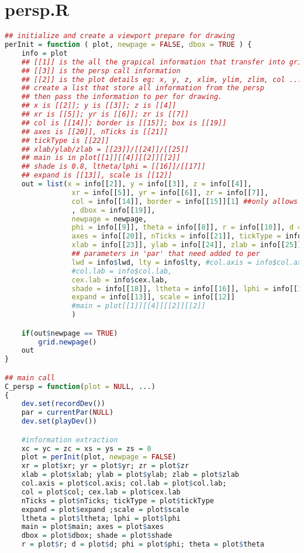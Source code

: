 \section{persp.R}
\begin{lstlisting}[language = R]
## initialize and create a viewport prepare for drawing
perInit = function ( plot, newpage = FALSE, dbox = TRUE ) {
    info = plot
    ## [[1]] is the all the grapical information that transfer into grid
    ## [[3]] is the persp call information
    ## [[2]] is the plot details eg: x, y, z, xlim, ylim, zlim, col ...
    ## create a list that store all information from the persp
    ## then pass the information to per for drawing.
    ## x is [[2]]; y is [[3]]; z is [[4]]
    ## xr is [[5]]; yr is [[6]]; zr is [[7]]
    ## col is [[14]]; border is [[15]]; box is [[19]]
    ## axes is [[20]], nTicks is [[21]]
    ## tickType is [[22]]
    ## xlab/ylab/zlab = [[23]]/[[24]]/[[25]]
    ## main is in plot[[1]][[4]][[2]][[2]]
    ## shade is 0.8, ltheta/lphi = [[16]]/[[17]]
    ## expand is [[13]], scale is [[12]]
    out = list(x = info[[2]], y = info[[3]], z = info[[4]],
                xr = info[[5]], yr = info[[6]], zr = info[[7]],
                col = info[[14]], border = info[[15]][1] ##only allows one color for border
                , dbox = info[[19]],
                newpage = newpage, 
                phi = info[[9]], theta = info[[8]], r = info[[10]], d = info[[11]],
                axes = info[[20]], nTicks = info[[21]], tickType = info[[22]],
                xlab = info[[23]], ylab = info[[24]], zlab = info[[25]],
                ## parameters in 'par' that need added to per
                lwd = info$lwd, lty = info$lty, #col.axis = info$col.axis,
                #col.lab = info$col.lab, 
                cex.lab = info$cex.lab, 
                shade = info[[18]], ltheta = info[[16]], lphi = info[[17]],
                expand = info[[13]], scale = info[[12]]
                #main = plot[[1]][[4]][[2]][[2]]
                )

    if(out$newpage == TRUE)
        grid.newpage()
    out
}

## main call 
C_persp = function(plot = NULL, ...)
{
    dev.set(recordDev())
    par = currentPar(NULL)
    dev.set(playDev())

    #information extraction
    xc = yc = zc = xs = ys = zs = 0
    plot = perInit(plot, newpage = FALSE)
    xr = plot$xr; yr = plot$yr; zr = plot$zr
    xlab = plot$xlab; ylab = plot$ylab; zlab = plot$zlab
    col.axis = plot$col.axis; col.lab = plot$col.lab; 
    col = plot$col; cex.lab = plot$cex.lab
    nTicks = plot$nTicks; tickType = plot$tickType
    expand = plot$expand ;scale = plot$scale
    ltheta = plot$ltheta; lphi = plot$lphi
    main = plot$main; axes = plot$axes
    dbox = plot$dbox; shade = plot$shade
    r = plot$r; d = plot$d; phi = plot$phi; theta = plot$theta


\end{lstlisting}
